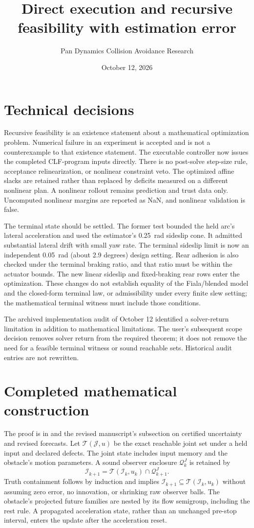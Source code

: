 \documentclass[11pt]{article}
\title{Direct execution and recursive feasibility with estimation error}
\author{Pan Dynamics Collision Avoidance Research}
\date{October 12, 2026}
\begin{document}
\maketitle

\section{Technical decisions}
Recursive feasibility is an existence statement about a mathematical
optimization problem. Numerical failure in an experiment is accepted and
is not a counterexample to that existence statement. The executable
controller now issues the completed CLF-program inputs directly. There is
no post-solve step-size rule, acceptance relinearization, or nonlinear
constraint veto. The optimized affine slacks are retained rather than
replaced by deficits measured on a different nonlinear plan. A nonlinear
rollout remains prediction and trust data only. Uncomputed nonlinear
margins are reported as NaN, and nonlinear validation is false.

The terminal state should be settled. The former test bounded the held
arc's lateral acceleration and used the estimator's 0.25~rad sideslip
cone. It admitted substantial lateral drift with small yaw rate. The
terminal sideslip limit is now an independent 0.05~rad (about 2.9 degrees)
design setting. Rear adhesion is also checked under the terminal braking
ratio, and that ratio must be within the actuator bounds. The new linear
sideslip and fixed-braking rear rows enter the optimization. These changes
do not establish equality of the Fiala/blended model and the closed-form
terminal law, or admissibility under every finite slew setting; the
mathematical terminal witness must include those conditions.

The archived implementation audit of October 12 identified a solver-return
limitation in addition to mathematical limitations. The user's subsequent
scope decision removes solver return from the required theorem; it does
not remove the need for a feasible terminal witness or sound reachable
sets. Historical audit entries are not rewritten.

\section{Completed mathematical construction}
The proof is in  and the
revised manuscript's subsection on certified uncertainty and revised
forecasts. Let $\mathcal T(\mathcal J,u)$ be the exact reachable joint set
under a held input and declared defects. The joint state includes input
memory and the obstacle's motion parameters. A sound observer enclosure
$\mathcal Q_k^J$ is retained by
\[
 \mathcal I_{k+1}=\mathcal T(\mathcal I_k,u_k)\cap\mathcal Q_{k+1}^J.
\]
Truth containment follows by induction and implies
$\mathcal I_{k+1}\subseteq\mathcal T(\mathcal I_k,u_k)$ without assuming
zero error, no innovation, or shrinking raw observer balls. The obstacle's
projected future families are nested by its flow semigroup, including the
rest rule. A propagated acceleration state, rather than an unchanged
pre-stop interval, enters the update after the acceleration reset.
\end{document}
